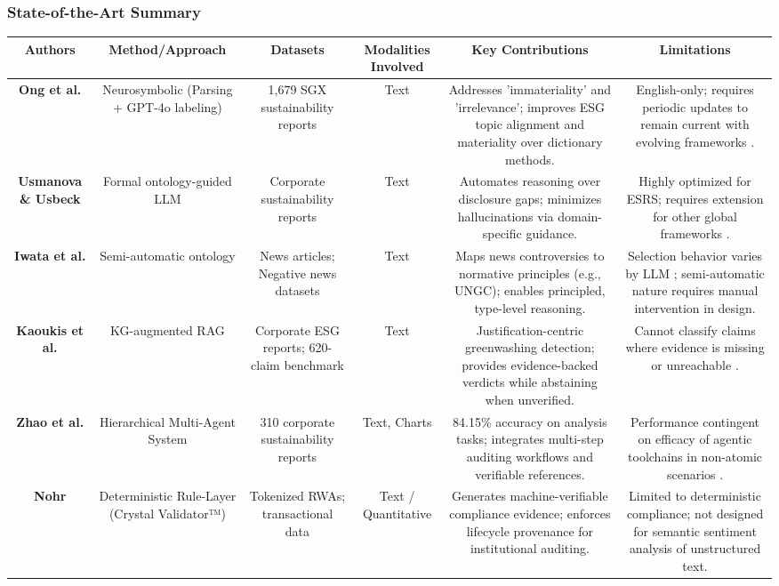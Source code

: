 \documentclass{article}
\begin{document}
\subsubsection{State-of-the-Art Summary}
\begin{table}[h!]
\centering
\begin{tabular}{|c|c|c|c|c|c|}
\hline
Authors & Method/Approach & Datasets & Modalities Involved & Key Contributions & Limitations \\ \hline
\textbf{Ong et al. } \parencite{keane_ong_8fec4760} & Neurosymbolic (Parsing + GPT-4o labeling) & 1,679 SGX sustainability reports & Text & Addresses 'immateriality' and 'irrelevance'; improves ESG topic alignment and materiality over dictionary methods. & English-only; requires periodic updates to remain current with evolving frameworks  \parencite{keane_ong_8fec4760}. \\ \hline
\textbf{Usmanova \& Usbeck } \parencite{aida_usmanova_e9b44e1d} & Formal ontology-guided LLM & Corporate sustainability reports & Text & Automates reasoning over disclosure gaps; minimizes hallucinations via domain-specific guidance. & Highly optimized for ESRS; requires extension for other global frameworks  \parencite{aida_usmanova_e9b44e1d}. \\ \hline
\textbf{Iwata et al. } \parencite{tsuyoshi_iwata_18ccc0b8} & Semi-automatic ontology & News articles; Negative news datasets & Text & Maps news controversies to normative principles (e.g., UNGC); enables principled, type-level reasoning. & Selection behavior varies by LLM  \parencite{tsuyoshi_iwata_18ccc0b8}; semi-automatic nature requires manual intervention in design. \\ \hline
\textbf{Kaoukis et al. } \parencite{kaoukis__georgios_35bab107} & KG-augmented RAG & Corporate ESG reports; 620-claim benchmark  \parencite{georgios_kaoukis_91737dd6} & Text & Justification-centric greenwashing detection; provides evidence-backed verdicts while abstaining when unverified. & Cannot classify claims where evidence is missing or unreachable  \parencite{kaoukis__georgios_35bab107}. \\ \hline
\textbf{Zhao et al. } \parencite{yilei_zhao_b7bbd9c8} & Hierarchical Multi-Agent System & 310 corporate sustainability reports & Text, Charts & 84.15\% accuracy on analysis tasks; integrates multi-step auditing workflows and verifiable references. & Performance contingent on efficacy of agentic toolchains in non-atomic scenarios  \parencite{yilei_zhao_b7bbd9c8}. \\ \hline
\textbf{Nohr } \parencite{steven_paul_nohr_a6874924} & Deterministic Rule-Layer (Crystal Validator™) & Tokenized RWAs; transactional data & Text / Quantitative & Generates machine-verifiable compliance evidence; enforces lifecycle provenance for institutional auditing. & Limited to deterministic compliance; not designed for semantic sentiment analysis of unstructured text. \\ \hline

\end{tabular}
\end{table}
\end{document}

